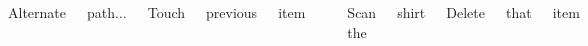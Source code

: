 \documentclass[pdf]{beamer}
\begin{document}
\begin{frame}
\begin{columns}[t]
\vspace{-2cm}
\tiny\centerline {Alternate}
\tiny\centerline {path...} \vspace{3cm} \hfill \break
\hfill \linebreak
\tiny\centerline {Touch}
\tiny\centerline {previous}
\tiny\centerline {item\textrightarrow}
\hspace{-1.3cm}
\centering
\includegraphics[width=4cm,height=4cm]{slide22pic1.png}\\
\hspace{-1.3cm}
\includegraphics[width=4cm,height=4cm]{slide22pic2.png} 
\vspace{-2cm}
\tiny\centerline {Scan the}
\tiny\centerline {shirt\textrightarrow} \vspace{3cm} \hfill \break
\hfill \linebreak
\tiny\centerline {Delete}
\tiny\centerline {that}
\tiny\centerline {item\textrightarrow}
\centering
\hspace{-1.3cm}
\includegraphics[width=4cm,height=4cm]{slide22pic3.png}\\
\hspace{-1.3cm}
\includegraphics[width=4cm,height=4cm]{slide22pic4.png}
\end{columns}
\end{frame}
\end{document}
